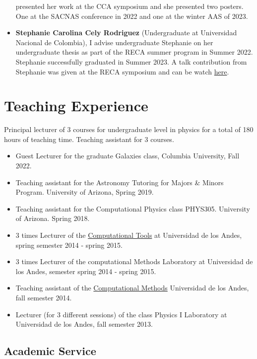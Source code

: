 \documentclass[14pt]{article}
\begin{document}
\begin{itemize}
    presented her work at the CCA symposium and she presented two posters. One
    at the SACNAS conference in 2022 and one at the winter AAS of 2023. 
  \item \textbf{Stephanie Carolina Cely Rodriguez} (Undergraduate at Universidad
    Nacional de Colombia), I advise undergraduate Stephanie on her undergraduate thesis as part of the
   RECA summer program in  Summer 2022. Stephanie successfully graduated in
   Summer 2023. A talk contribution from Stephanie was given at the RECA
   symposium and can be watch \href{https://www.youtube.com/watch?v=5SeOW060m24&t=1774s}{here}.
\end{itemize}

\section*{Teaching Experience}

Principal lecturer of 3 courses for undergraduate level in physics for a total
of 180 hours of teaching time. Teaching assistant for 3 courses.

\begin{itemize}
  \setlength\itemsep{0.0em}
  \renewcommand\labelitemi{$\cdot$}
\item Guest Lecturer for the graduate Galaxies class, Columbia University, Fall 2022.
\item Teaching assistant for the Astronomy Tutoring for Majors \& Minors Program. University of Arizona, Spring 2019. 
\item Teaching assistant for the Computational Physics class  PHYS305. University of Arizona. Spring 2018.
\item 3 times Lecturer of the \href{https://github.com/ComputoCienciasUniandes/HerramientasComputacionales}{Computational
  Tools} at Universidad de los Andes, spring semester 2014 - spring 2015.
\item 3 times Lecturer of the computational Methods Laboratory at Universidad de los Andes, semester spring 2014 -  spring 2015.
\item Teaching assistant of the
  \href{https://github.com/ComputoCienciasUniandes/MetodosComputacionales}{Computational
  Methods} Universidad de los Andes, fall  semester 2014.
\item Lecturer (for 3 different sessions) of the class Physics I Laboratory at Universidad de los Andes, fall semester 2013.
\end{itemize}


\subsection*{Academic Service} 
\end{document}
